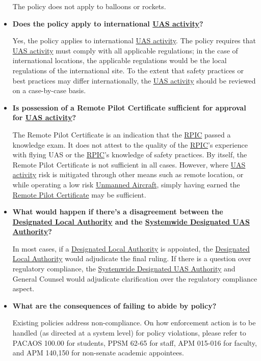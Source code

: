 \documentclass[
]{book}
\begin{document}
\begin{itemize}
  The policy does not apply to balloons or rockets.
\item
  \textbf{Does the policy apply to international \protect\hyperlink{UASactivity}{UAS activity}?}

  Yes, the policy applies to international \protect\hyperlink{UASactivity}{UAS activity}. The policy requires that \protect\hyperlink{UASactivity}{UAS activity} must comply with all applicable regulations; in the case of international locations, the applicable regulations would be the local regulations of the international site. To the extent that safety practices or best practices may differ internationally, the \protect\hyperlink{UASactivity}{UAS activity} should be reviewed on a case-by-case basis.
\item
  \textbf{Is possession of a Remote Pilot Certificate sufficient for approval for \protect\hyperlink{UASactivity}{UAS activity}?}

  The Remote Pilot Certificate is an indication that the \protect\hyperlink{RPIC}{RPIC} passed a knowledge exam. It does not attest to the quality of the \protect\hyperlink{RPIC}{RPIC}'s experience with flying UAS or the \protect\hyperlink{RPIC}{RPIC}'s knowledge of safety practices. By itself, the Remote Pilot Certificate is not sufficient in all cases. However, where \protect\hyperlink{UASactivity}{UAS activity} risk is mitigated through other means such as remote location, or while operating a low risk \protect\hyperlink{UA}{Unmanned Aircraft}, simply having earned the \protect\hyperlink{RPC}{Remote Pilot Certificate} may be sufficient.
\item
  \textbf{What would happen if there's a disagreement between the \protect\hyperlink{DLA}{Designated Local Authority} and the \protect\hyperlink{SDA}{Systemwide Designated UAS Authority}?}

  In most cases, if a \protect\hyperlink{DLA}{Designated Local Authority} is appointed, the \protect\hyperlink{DLA}{Designated Local Authority} would adjudicate the final ruling. If there is a question over regulatory compliance, the \protect\hyperlink{SDA}{Systemwide Designated UAS Authority} and General Counsel would adjudicate clarification over the regulatory compliance aspect.
\item
  \textbf{What are the consequences of failing to abide by policy?}

  Existing policies address non-compliance. On how enforcement action is to be handled (as directed at a system level) for policy violations, please refer to PACAOS 100.00 for students, PPSM 62-65 for staff, APM 015-016 for faculty, and APM 140,150 for non-senate academic appointees.
\end{itemize}
\end{document}

